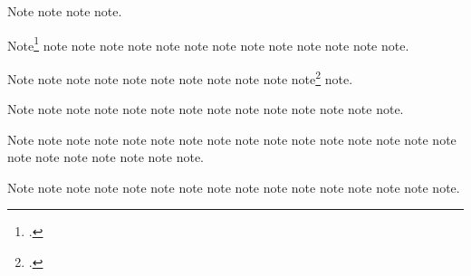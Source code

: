 \documentclass[a4paper,12pt]{report}
\begin{document}
Note\autocite{danforth:podcast} note\autocite{davenport:attention}
note\autocite{creasey:york:death} note\autocite{creasey:morton:hide}.

Note\footnote{.}
note\autocite{diaz:surprise} note\autocite{dinkel:agassiz}
note\autocite{donne:var} note\autocite{danforth:podcast}
note\autocite{davenport:attention} note\autocite{dunn:revolutions}
note\autocite{diaz:surprise} note\autocite{dyna:browser}
note\autocite{dinkel:agassiz} note\autocite{eliot:pound}
note\autocite{ellet:galena} note\autocite{donne:var}
note\autocite{dyna:browser}.

Note\autocite{ellis:blog} note\autocite{emerson:nature}
note note\autocite{dunn:revolutions}
note\autocite{eliot:pound} note\autocite{euripides:orestes}
note\autocite{ellet:galena} note\autocite{ellis:blog}
note\autocite{emerson:nature} note\autocite{evanston:library}
note\footnote{.}
note\autocite{floyd:atom}.

Note\autocite{euripides:orestes} note\autocite{frede:inproc}
note\autocite{friedman:learning} note\autocite{evanston:library}
note\autocite{feydeau:farces} note\autocite{floyd:atom}
note\autocite{frede:inproc} note\autocite{friedman:learning}
note\autocite{friends:leia} note\autocite{furet:passing:eng}
note\autocite{garaud:gatine} note\autocite{garrett}
note\autocite{genbank:db} note\autocite{naraya}.

Note\autocite{gibbard} note\autocite{friends:leia}
note\autocite{furet:passing:eng} note\autocite{garrett}
note\autocite{genbank:db} note\autocite{naraya}
note\autocite{good:wholeissue} note\autocite{gourmet:052006}
note\autocite{garaud:gatine} note\autocite{gems:print}
note\autocite{gems:ipad} note\autocite{greek:filmstrip}
note\autocite{grove:sibelius} note\autocite{hamilton:miranda}
note\autocite{handel:messiah} note\autocite{harley:cartography}
note\autocite{harley:ancient:cart} note\autocite{harwood:biden}
note\autocite{gibbard} note\autocite{harleymt:hoc}
note\autocite{harleymt:hoc-harleymt:ancient:cart}
note\autocite{harleymt:hoc-harleymt:cartography}
note\autocite[7.1.2]{herodotus:wilson}.

Note\autocite{hitchcock:nbynw} note\autocite{gems:print}
note\autocite{gems:ipad} note\autocite{good:wholeissue}
note\autocite{hlatky:hrt} note\autocite{greek:filmstrip}
note\autocite{gourmet:052006} note\autocite{hamilton:miranda}
note\autocite{handel:messiah} note\autocite{harwood:biden}
note\autocite[Sibelius, Jean]{grove:sibelius}
note\autocite{hitchcock:nbynw} note\autocite{holiday:fool}
note\autocite{horsley:prosodies} note\autocite{harley:cartography}
note\autocite{horowitz:youtube}.
\end{document}

